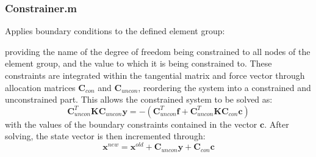 \documentclass[3p]{elsarticle} %
\begin{document}
\subsubsection{Constrainer.m}
Applies boundary conditions to the defined element group:

providing the name of the degree of freedom being constrained to all nodes of the element group, and the value to which it is being constrained to. These constraints are integrated within the tangential matrix and force vector through  allocation matrices $\bm{C}_{con}$ and $\bm{C}_{uncon}$, reordering the system into a constrained and unconstrained part. This allows the constrained system to be solved as:
\begin{equation}
	\bm{C}_{uncon}^T \bm{K} \bm{C}_{uncon} \mathbf{y} = -\left(\bm{C}_{uncon}^T\bm{f}+\bm{C}_{uncon}^T \bm{K} \bm{C}_{con}\mathbf{c}\right)
\end{equation}
with the values of the boundary constraints contained in the vector $\mathbf{c}$. After solving, the state vector is then incremented through:
\begin{equation}
	\mathbf{x}^{new} = \mathbf{x}^{old} + \bm{C}_{uncon}\mathbf{y} + \bm{C}_{con}\mathbf{c}
\end{equation}
\end{document}
